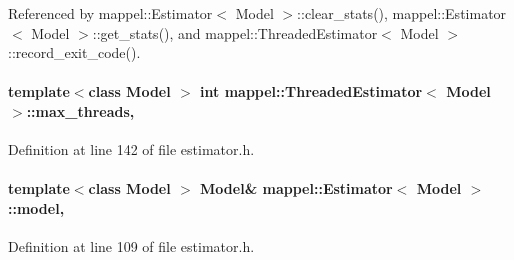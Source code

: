 Referenced by mappel\+::\+Estimator$<$ Model $>$\+::clear\+\_\+stats(), mappel\+::\+Estimator$<$ Model $>$\+::get\+\_\+stats(), and mappel\+::\+Threaded\+Estimator$<$ Model $>$\+::record\+\_\+exit\+\_\+code().

\paragraph[{\texorpdfstring{max\+\_\+threads}{max_threads}}]{\setlength{\rightskip}{0pt plus 5cm}template$<$class Model $>$ int {\bf mappel\+::\+Threaded\+Estimator}$<$ Model $>$\+::max\+\_\+threads\hspace{0.3cm}{\ttfamily [protected]}, {\ttfamily [inherited]}}\hypertarget{classmappel_1_1ThreadedEstimator_a31391f8aaab3484f58bfdedbdb22be42}{}\label{classmappel_1_1ThreadedEstimator_a31391f8aaab3484f58bfdedbdb22be42}


Definition at line 142 of file estimator.\+h.

\paragraph[{\texorpdfstring{model}{model}}]{\setlength{\rightskip}{0pt plus 5cm}template$<$class Model $>$ Model\& {\bf mappel\+::\+Estimator}$<$ Model $>$\+::model\hspace{0.3cm}{\ttfamily [protected]}, {\ttfamily [inherited]}}\hypertarget{classmappel_1_1Estimator_a8322546d87ccdf01f8b0dcd9dae509f0}{}\label{classmappel_1_1Estimator_a8322546d87ccdf01f8b0dcd9dae509f0}


Definition at line 109 of file estimator.\+h.



